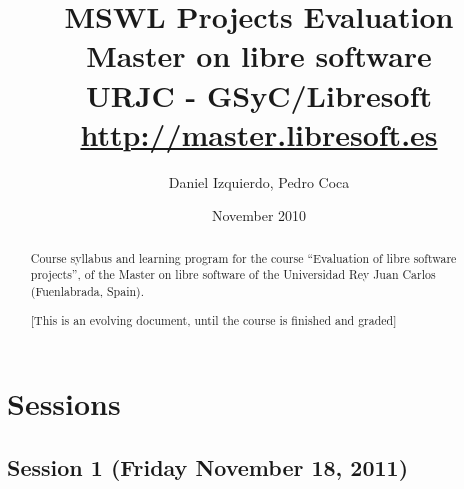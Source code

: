 \documentclass[a4paper]{article}
\title{MSWL Projects Evaluation \\
Master on libre software \\
URJC - GSyC/Libresoft \\
\url{http://master.libresoft.es}}
\author{Daniel Izquierdo, Pedro Coca}
\date{November 2010}
\begin{document}
\maketitle

\begin{abstract}
Course syllabus and learning program for the course ``Evaluation of libre software projects'', 
of the Master on libre software of the Universidad Rey Juan Carlos (Fuenlabrada, Spain).

[This is an evolving document, until the course is finished and graded]
\end{abstract}

\tableofcontents


\section{Sessions}

\subsection{Session 1 (Friday November 18, 2011)}
\end{document}

